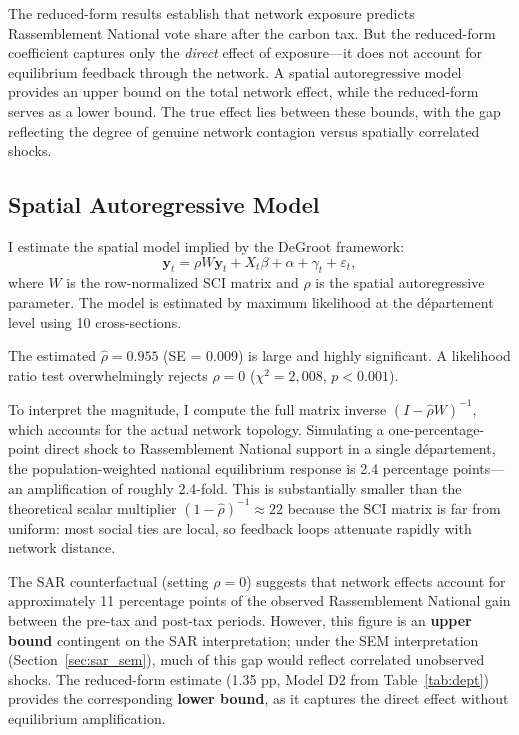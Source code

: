 \documentclass[12pt]{article}
\newcommand{\rn}{Rassemblement National}
\newcommand{\dept}{d\'{e}partement}
\begin{document}
The reduced-form results establish that network exposure predicts \rn{} vote share after the carbon tax. But the reduced-form coefficient captures only the \emph{direct} effect of exposure---it does not account for equilibrium feedback through the network. A spatial autoregressive model provides an upper bound on the total network effect, while the reduced-form serves as a lower bound. The true effect lies between these bounds, with the gap reflecting the degree of genuine network contagion versus spatially correlated shocks.

\subsection{Spatial Autoregressive Model}

I estimate the spatial model implied by the DeGroot framework:
\begin{equation}
\mathbf{y}_t = \rho W \mathbf{y}_t + X_t \beta + \alpha + \gamma_t + \varepsilon_t,
\label{eq:sar}
\end{equation}
where $W$ is the row-normalized SCI matrix and $\rho$ is the spatial autoregressive parameter. The model is estimated by maximum likelihood at the \dept{} level using 10 cross-sections.

The estimated $\hat{\rho} = 0.955$ (SE = 0.009) is large and highly significant. A likelihood ratio test overwhelmingly rejects $\rho = 0$ ($\chi^2 = 2{,}008$, $p < 0.001$).

To interpret the magnitude, I compute the full matrix inverse $(I - \hat{\rho} W)^{-1}$, which accounts for the actual network topology. Simulating a one-percentage-point direct shock to \rn{} support in a single \dept{}, the population-weighted national equilibrium response is 2.4 percentage points---an amplification of roughly 2.4-fold. This is substantially smaller than the theoretical scalar multiplier $(1 - \hat{\rho})^{-1} \approx 22$ because the SCI matrix is far from uniform: most social ties are local, so feedback loops attenuate rapidly with network distance.

The SAR counterfactual (setting $\rho = 0$) suggests that network effects account for approximately 11 percentage points of the observed \rn{} gain between the pre-tax and post-tax periods. However, this figure is an \textbf{upper bound} contingent on the SAR interpretation; under the SEM interpretation (Section~\ref{sec:sar_sem}), much of this gap would reflect correlated unobserved shocks. The reduced-form estimate (1.35 pp, Model D2 from Table~\ref{tab:dept}) provides the corresponding \textbf{lower bound}, as it captures the direct effect without equilibrium amplification.
\end{document}
